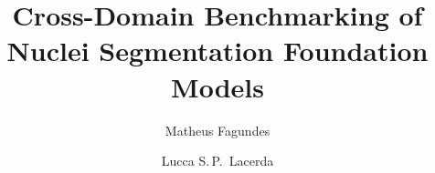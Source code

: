 \title[Cross-Domain Nuclei Segmentation Benchmark]{Cross-Domain Benchmarking of Nuclei Segmentation Foundation Models}

\author[Fagundes \& Lacerda]{Matheus Fagundes \and Lucca S.\,P.\ Lacerda}


\date{}
